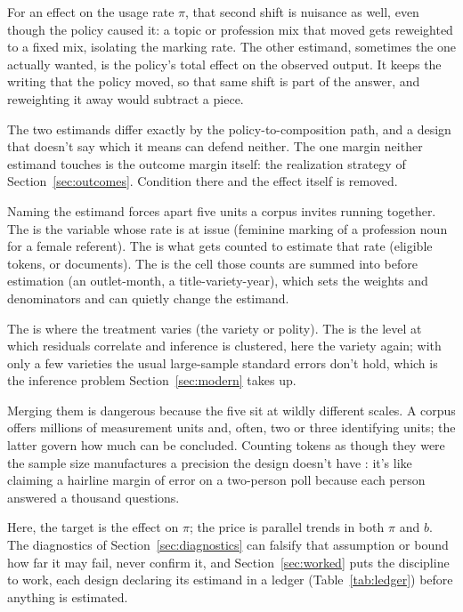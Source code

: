 For an effect on the usage rate $\pi$, that second shift is nuisance as well, even though the policy caused it: a topic or profession mix that moved gets reweighted to a fixed mix, isolating the marking rate. The other estimand, sometimes the one actually wanted, is the policy's total effect on the observed output. It keeps the writing that the policy moved, so that same shift is part of the answer, and reweighting it away would subtract a piece.

The two estimands differ exactly by the policy-to-composition path, and a design that doesn't say which it means can defend neither. The one margin neither estimand touches is the outcome margin itself: the realization strategy of Section~\ref{sec:outcomes}. Condition there and the effect itself is removed.

Naming the estimand forces apart five units a corpus invites running together. The  is the variable whose rate is at issue (feminine marking of a profession noun for a female referent). The  is what gets counted to estimate that rate (eligible tokens, or documents). The  is the cell those counts are summed into before estimation (an outlet-month, a title-variety-year), which sets the weights and denominators and can quietly change the estimand.

The  is where the treatment varies (the variety or polity). The  is the level at which residuals correlate and inference is clustered, here the variety again; with only a few varieties the usual large-sample standard errors don't hold, which is the inference problem Section~\ref{sec:modern} takes up.

Merging them is dangerous because the five sit at wildly different scales. A corpus offers millions of measurement units and, often, two or three identifying units; the latter govern how much can be concluded. Counting tokens as though they were the sample size manufactures a precision the design doesn't have \citep{BertrandDufloMullainathan2004}: it's like claiming a hairline margin of error on a two-person poll because each person answered a thousand questions.

Here, the target is the effect on $\pi$; the price is parallel trends in both $\pi$ and $b$. The diagnostics of Section~\ref{sec:diagnostics} can falsify that assumption or bound how far it may fail, never confirm it, and Section~\ref{sec:worked} puts the discipline to work, each design declaring its estimand in a ledger (Table~\ref{tab:ledger}) before anything is estimated.
